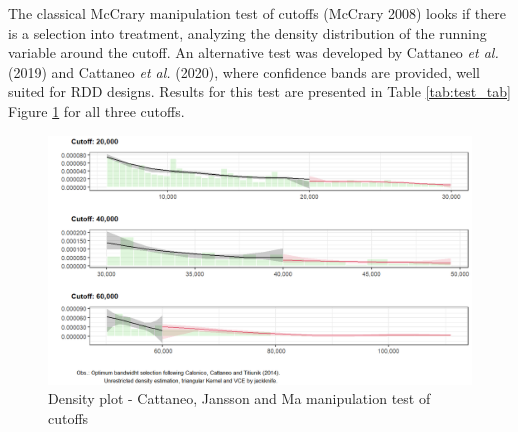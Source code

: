 \documentclass[
  12pt,
]{article}
\begin{document}
The classical McCrary manipulation test of cutoffs (McCrary 2008) looks
if there is a selection into treatment, analyzing the density
distribution of the running variable around the cutoff. An alternative
test was developed by Cattaneo \emph{et al.} (2019) and Cattaneo
\emph{et al.} (2020), where confidence bands are provided, well suited
for RDD designs. Results for this test are presented in Table
\ref{tab:test_tab} Figure \ref{fig:test_plot} for all three cutoffs.

\begin{table}[!h]

\caption{\label{tab:test_tab}Cattaneo, Jansson and Ma manipulation test of cutoffs}
\centering
{}
\end{table}

\begin{figure}
\centering
\includegraphics{artigo1_files/figure-latex/test_plot-1.png}
\caption{Density plot - Cattaneo, Jansson and Ma manipulation test of
cutoffs \label{fig:test_plot}}
\end{figure}
\end{document}
